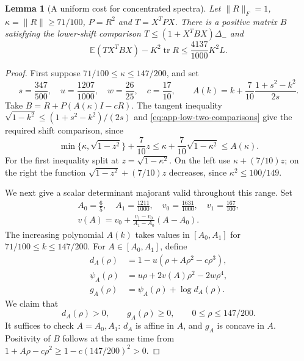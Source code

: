 \documentclass[11pt,a4paper]{article}
\numberwithin{equation}{section}
\newtheorem{lemma}[theorem]{Lemma}
\begin{document}
\begin{lemma}[A uniform cost for concentrated spectra]
\label{lem:general-lower-plateau}
Let $\|R\|_F=1$, $\kappa=\|R\|\ge71/100$, $P=R^2$ and
$T=X^TPX$. There is a positive matrix $B$ satisfying the lower-shift
comparison $T\le(1+X^TBX)\Delta_-$ and
\[
 \mathbb E(TX^TBX)-K^2\operatorname{tr}R
       \le\frac{4137}{1000}K^2L.
\]
\end{lemma}
\begin{proof}
First suppose $71/100\le\kappa\le147/200$, and set
\[
 s=\frac{347}{500},\quad u=\frac{1207}{1000},\quad
 w=\frac{26}{25},\quad c=\frac{17}{10},\qquad
 A(k)=k+\frac7{10}\frac{1+s^2-k^2}{2s}.
\]
Take $B=R+P(A(\kappa)I-cR)$.
The tangent inequality $\sqrt{1-k^2}\le(1+s^2-k^2)/(2s)$ and
\eqref{eq:app-low-two-comparisons} give the required shift comparison,
since
\[
 \min\{\kappa,\sqrt{1-z^2}\}+\frac7{10}z
 \le\kappa+\frac7{10}\sqrt{1-\kappa^2}\le A(\kappa).
\]
For the first inequality split at $z=\sqrt{1-\kappa^2}$.
On the left use $\kappa+(7/10)z$; on the right the function
$\sqrt{1-z^2}+(7/10)z$ decreases, since $\kappa^2\le100/149$.

We next give a scalar determinant majorant valid throughout this range.
Set
\[
 \begin{gathered}
 A_0=\frac65,\quad A_1=\frac{1211}{1000},\quad
 v_0=\frac{1631}{1000},\quad v_1=\frac{167}{100},\\
 v(A)=v_0+\frac{v_1-v_0}{A_1-A_0}(A-A_0).
 \end{gathered}
\]
The increasing polynomial $A(k)$ takes values in $[A_0,A_1]$ for
$71/100\le k\le147/200$. For $A\in[A_0,A_1]$, define
\[
 \begin{aligned}
 d_A(\rho)&=1-u(\rho+A\rho^2-c\rho^3),\\
 \psi_A(\rho)&=u\rho+2v(A)\rho^2-2w\rho^4,\\
 g_A(\rho)&=\psi_A(\rho)+\log d_A(\rho).
 \end{aligned}
\]
We claim that
\begin{equation}\label{eq:general-plateau-scalar}
 d_A(\rho)>0,\qquad g_A(\rho)\ge0,
       \qquad 0\le\rho\le147/200.
\end{equation}
It suffices to check $A=A_0,A_1$: $d_A$ is affine in $A$, and
$g_A$ is concave in $A$. Positivity of $B$ follows at the same time
from $1+A\rho-c\rho^2\ge1-c(147/200)^2>0$.


\end{proof}
\end{document}
